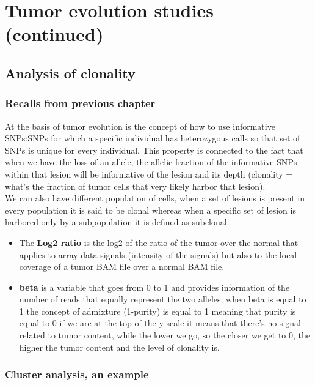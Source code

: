 \graphicspath{{chapters/notes/06/images/}}
\chapter{Tumor evolution studies (continued)}

\section{Analysis of clonality}
\subsection{Recalls from previous chapter}
At the basis of tumor evolution is the concept of how to use informative SNPs:SNPs for which a specific individual has heterozygous calls so that set of SNPs is unique for every individual.
This property is connected to the fact that when we have the loss of an allele, the allelic fraction of the informative SNPs within that lesion will be informative of the lesion and its depth (clonality = what's the fraction of tumor cells that very likely harbor that lesion).
\\
We can also have different population of cells, when a set of lesions is present in every population it is said to be clonal whereas when a specific set of lesion is harbored only by a subpopulation it is defined as subclonal.

\begin{itemize}
\item The \textbf{Log2 ratio} is the log2 of the ratio of the tumor over the normal that
applies to array data signals (intensity of the signals) but also to the local
coverage of a tumor BAM file over a normal BAM file.
\item \textbf{beta} is a variable that goes from 0 to 1 and provides information of
the number of reads that equally represent the two alleles; when beta is equal
to 1 the concept of admixture (1-purity) is equal to 1 meaning that purity is
equal to 0 if we are at the top of the y scale it means that there's no signal
related to tumor content, while the lower we go, so the closer we get to 0, the
higher the tumor content and the level of clonality is.
\end{itemize}

\subsection{Cluster analysis, an example}

